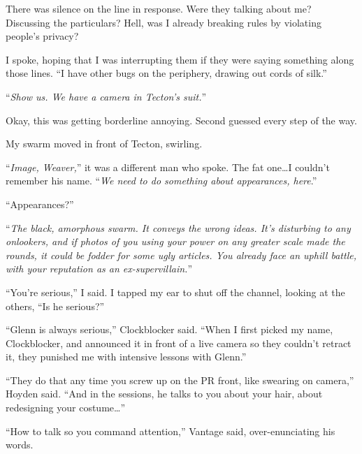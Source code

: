 There was silence on the line in response.  Were they talking about me?  Discussing the particulars?  Hell, was I already breaking rules by violating people's privacy?



I spoke, hoping that I was interrupting them if they were saying something along those lines.  ``I have other bugs on the periphery, drawing out cords of silk.''



``\emph{Show us.  We have a camera in Tecton's suit.}''



Okay, this was getting borderline annoying.  Second guessed every step of the way.



My swarm moved in front of Tecton, swirling.



``\emph{Image, Weaver,}'' it was a different man who spoke.  The fat one\ldots I couldn't remember his name.  ``\emph{We need to do something about appearances, here}.''



``Appearances?''



``\emph{The black, amorphous swarm.  It conveys the wrong ideas.  It's disturbing to any onlookers, and if photos of you using your power on any greater scale made the rounds, it could be fodder for some ugly articles.  You already face an uphill battle, with your reputation as an ex-supervillain.}''



``You're serious,'' I said.  I tapped my ear to shut off the channel, looking at the others, ``Is he serious?''



``Glenn is always serious,'' Clockblocker said.  ``When I first picked my name, Clockblocker, and announced it in front of a live camera so they couldn't retract it, they punished me with intensive lessons with Glenn.''



``They do that any time you screw up on the PR front, like swearing on camera,'' Hoyden said.  ``And in the sessions, he talks to you about your hair, about redesigning your costume\ldots''



``How to talk so you command attention,'' Vantage said, over-enunciating his words.



